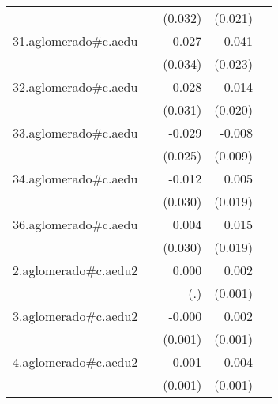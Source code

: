 {\begin{longtable}{l*{4}{D{.}{.}{-1}}}
            &                     &     (0.032)         &     (0.021)         &                     \\
\addlinespace
31.aglomerado#c.aedu&                     &       0.027         &       0.041         &                     \\
            &                     &     (0.034)         &     (0.023)         &                     \\
\addlinespace
32.aglomerado#c.aedu&                     &      -0.028         &      -0.014         &                     \\
            &                     &     (0.031)         &     (0.020)         &                     \\
\addlinespace
33.aglomerado#c.aedu&                     &      -0.029         &      -0.008         &                     \\
            &                     &     (0.025)         &     (0.009)         &                     \\
\addlinespace
34.aglomerado#c.aedu&                     &      -0.012         &       0.005         &                     \\
            &                     &     (0.030)         &     (0.019)         &                     \\
\addlinespace
36.aglomerado#c.aedu&                     &       0.004         &       0.015         &                     \\
            &                     &     (0.030)         &     (0.019)         &                     \\
\addlinespace
2.aglomerado#c.aedu2&                     &       0.000         &       0.002\sym{*}  &                     \\
            &                     &         (.)         &     (0.001)         &                     \\
\addlinespace
3.aglomerado#c.aedu2&                     &      -0.000         &       0.002         &                     \\
            &                     &     (0.001)         &     (0.001)         &                     \\
\addlinespace
4.aglomerado#c.aedu2&                     &       0.001         &       0.004\sym{***}&                     \\
            &                     &     (0.001)         &     (0.001)         &                     \\

\end{longtable}}

